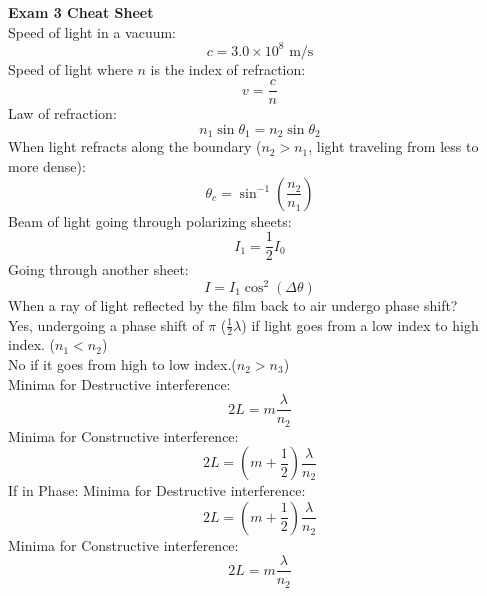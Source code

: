 \documentclass[11pt]{article}
\begin{document}
    \noindent \textbf{Exam 3 Cheat Sheet}%
    \\ \noindent \newline
    Speed of light in a vacuum:
      \begin{equation}
        c  =  3.0 \times 10^8 \text{ m/s} \tag{in a vacuum}
    \end{equation}
    Speed of light where $n$ is the index of refraction:
    \begin{equation}
      v = \frac{c}{n} \tag{speed of light}
    \end{equation}
    Law of refraction:
\begin{equation}
  n_1 \sin \theta_1 = n_2 \sin \theta_2 \tag{Snell's Law}
\end{equation}
When light refracts along the boundary ($n_2 > n_1$, light traveling from less to more dense):
\begin{equation}
  \theta_c = \sin^{-1} (\frac{n_2}{n_1}) \tag{Critical angle}
\end{equation}
Beam of light going through polarizing sheets:
\begin{equation}
  I_1 = \frac{1}{2} I_0 \tag{one half rule}
 \end{equation}
   Going through another sheet:
   \begin{equation}
     I = I_1 \cos^2 (\Delta \theta) \tag{cosine-squared}
    \end{equation}
    When a ray of light reflected by the film back to air undergo phase shift? \\
    Yes, undergoing a phase shift of $\pi$ ($\frac{1}{2} \lambda $) if light goes from
    a low index to high index. ($n_1 < n_2$)\\ 
    No if it goes from high to low index.($n_2 > n_3$)\\
    Minima for Destructive interference:
    \begin{equation}
      2L = m \frac{\lambda}{n_2}
    \end{equation}
    Minima for Constructive interference:
    \begin{equation}
      2L = (m+\frac{1}{2}) \frac{\lambda}{n_2}
    \end{equation}
    If in Phase:
    Minima for Destructive interference:
    \begin{equation}
      2L = (m+\frac{1}{2}) \frac{\lambda}{n_2}
    \end{equation}
    Minima for Constructive interference:
    \begin{equation}
      2L = m \frac{\lambda}{n_2}
    \end{equation}
\end{document}
